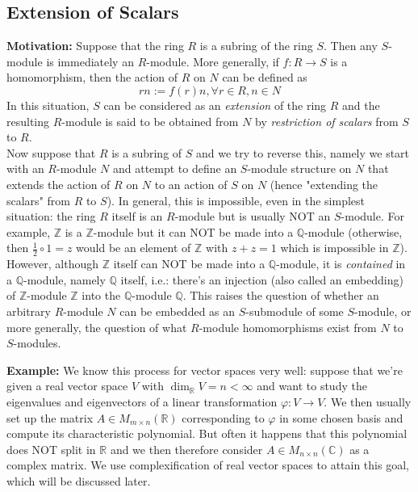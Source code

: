 \subsection{Extension of Scalars}

\noindent\textbf{Motivation:} Suppose that the ring $R$ is a subring of the ring $S$. Then any $S$-module is immediately an $R$-module. More generally, if $f:R\to S$ is a homomorphism, then the action of $R$ on $N$ can be defined as
$$rn:= f(r)n ,\forall r\in R,n\in N$$
In this situation, $S$ can be considered as an \textit{extension} of the ring $R$ and the resulting $R$-module is said to be obtained from $N$ by \textit{restriction of scalars} from $S$ to $R$.\\
Now suppose that $R$ is a subring of $S$ and we try to reverse this, namely we start with an $R$-module $N$ and attempt to define an $S$-module structure on $N$ that extends the action of $R$ on $N$ to an action of $S$ on $N$ (hence "extending the scalars" from $R$ to $S$). In general, this is impossible, even in the simplest situation: the ring $R$ itself is an $R$-module but is usually NOT an $S$-module. For example, $\mathbb{Z}$ is a $\mathbb{Z}$-module but it can NOT be made into a $\mathbb{Q}$-module (otherwise, then $\frac{1}{2} \circ 1=z$ would be an element of $\mathbb{Z}$ with $z+z=1$ which is impossible in $\mathbb{Z}$). However, although $\mathbb{Z}$ itself can NOT be made into a $\mathbb{Q}$-module, it is \textit{contained} in a $\mathbb{Q}$-module, namely $\mathbb{Q}$ itself, i.e.: there's an injection (also called an embedding) of $\mathbb{Z}$-module $\mathbb{Z}$ into the $\mathbb{Q}$-module $\mathbb{Q}$. This raises the question of whether an arbitrary $R$-module $N$ can be embedded as an $S$-submodule of some $S$-module, or more generally, the question of what $R$-module homomorphisms exist from $N$ to $S$-modules.

\noindent\textbf{Example:} We know this process for vector spaces very well: suppose that we're  given a real vector space $V$ with $\dim_\mathbb{R}V =n< \infty$ and want to study the eigenvalues and eigenvectors of a linear transformation $\varphi: V\to V$. We then usually set up the matrix $A\in M_{m\times n} (\mathbb{R})$ corresponding to $\varphi$ in some chosen basis and compute its characteristic polynomial. But often it happens that this polynomial does NOT split in $\mathbb{R}$ and we then therefore consider $A\in M_{n\times n} (\mathbb{C})$ as a complex matrix. We use complexification of real vector spaces to attain this goal, which will be discussed later.

